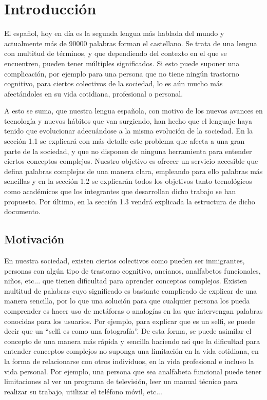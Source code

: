 \chapter{Introducción}
\label{cap:introduccion}


El español, hoy en día es la segunda lengua más hablada del mundo y actualmente más de 90000 palabras forman el castellano. 
Se trata de una lengua con multitud de términos, y que dependiendo del contexto en el que se encuentren, pueden tener múltiples significados.
Si esto puede suponer una complicación, por ejemplo para una persona que no tiene ningún trastorno cognitivo, para ciertos colectivos de la sociedad, lo es aún mucho más afectándoles en su vida cotidiana, profesional o personal. 

A esto se suma, que nuestra lengua española, con motivo de los nuevos avances en tecnología y nuevos hábitos que van surgiendo, han hecho que el lenguaje haya tenido que evolucionar adecuándose a la misma evolución de la sociedad.
En la sección 1.1 se explicará con más detalle este problema que afecta a una gran parte de la sociedad, y que no disponen de ninguna herramienta para entender ciertos conceptos complejos. 
Nuestro objetivo es ofrecer un servicio accesible que defina palabras complejas de una manera clara, empleando para ello palabras más sencillas y en la sección 1.2 se explicarán todos los objetivos tanto tecnológicos como académicos que los integrantes que desarrollan dicho trabajo se han propuesto.
Por último, en la sección 1.3 vendrá explicada la estructura de dicho documento.



	


\section{Motivación}
\label{cap:sec:motivacion}

En nuestra sociedad, existen ciertos colectivos como pueden ser inmigrantes, personas con algún tipo de trastorno cognitivo, ancianos, analfabetos funcionales, niños, etc... que tienen dificultad para aprender conceptos complejos. 
Existen multitud de palabras cuyo significado es bastante complicado de explicar de una manera sencilla, por lo que una solución para que cualquier persona los pueda comprender es hacer uso de metáforas o analogías en las que intervengan palabras conocidas para los usuarios. Por ejemplo, para explicar que es un selfi, se puede decir que un ``selfi es como una fotografía''. De esta forma, se puede asimilar el concepto de una manera más rápida y sencilla haciendo así que la dificultad para entender conceptos complejos no suponga una limitación en la vida cotidiana, en la forma de relacionarse con otros individuos, en la vida profesional e incluso la vida personal. 
Por ejemplo, una persona que sea analfabeta funcional puede tener limitaciones al ver un programa de televisión, leer un manual técnico para realizar su trabajo, utilizar el teléfono móvil, etc...

